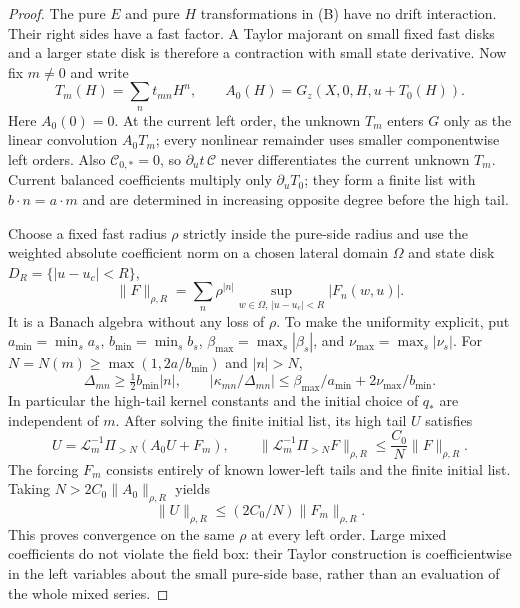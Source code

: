 \begin{proof}
The pure $E$ and pure $H$ transformations in (B) have no drift
interaction.  Their right sides have a fast factor.  A Taylor majorant
on small fixed fast disks and a larger state disk is therefore a
contraction with small state derivative.  Now fix $m\ne0$ and write
\[
 T_m(H)=\sum_n t_{mn}H^n,\qquad
 A_0(H)=G_z(X,0,H,u+T_0(H)).
\]
Here $A_0(0)=0$.  At the current left order, the unknown $T_m$ enters
$G$ only as the linear convolution $A_0T_m$; every nonlinear remainder
uses smaller componentwise left orders.  Also $\mathcal C_{0,*}=0$,
so $\partial_ut\,\mathcal C$ never differentiates the current unknown
$T_m$.  Current balanced coefficients multiply only
$\partial_uT_0$; they form a finite list with $b\cdot n=a\cdot m$ and
are determined in increasing opposite degree before the high tail.

Choose a fixed fast radius $\rho$ strictly inside the pure-side radius
and use the weighted absolute coefficient norm on a chosen lateral
domain $\Omega$ and state disk $D_R=\{|u-u_c|<R\}$,
\begin{equation}\label{eq:additive-tail-norm}
 \|F\|_{\rho,R}=\sum_n\rho^{|n|}
             \sup_{w\in\Omega,\,|u-u_c|<R}|F_n(w,u)|.
\end{equation}
It is a Banach algebra without any loss of $\rho$.  To make the uniformity
explicit, put $a_{\min}=\min_s a_s$, $b_{\min}=\min_s b_s$,
$\beta_{\max}=\max_s|\beta_s|$, and
$\nu_{\max}=\max_s|\nu_s|$.  For
$N=N(m)\ge\max(1,2a/b_{\min})$ and $|n|>N$,
\[
 \Delta_{mn}\ge\tfrac12 b_{\min}|n|,\qquad
 |\kappa_{mn}/\Delta_{mn}|
    \le\beta_{\max}/a_{\min}+2\nu_{\max}/b_{\min}.
\]
In particular the high-tail kernel constants and the initial choice of
$q_*$ are independent of $m$.
After solving the finite initial list, its high tail $U$ satisfies
\begin{equation}\label{eq:additive-tail-contraction}
 U=\mathcal L_m^{-1}\Pi_{>N}(A_0U+F_m),\qquad
 \|\mathcal L_m^{-1}\Pi_{>N}F\|_{\rho,R}
      \le\frac{C_0}{N}\|F\|_{\rho,R}.
\end{equation}
The forcing $F_m$ consists entirely of known lower-left tails and the
finite initial list.  Taking $N>2C_0\|A_0\|_{\rho,R}$ yields
\[
 \|U\|_{\rho,R}\le(2C_0/N)\|F_m\|_{\rho,R}.
\]
This proves convergence on the same $\rho$ at every left order.
Large mixed coefficients do not violate the field box: their Taylor
construction is coefficientwise in the left variables about the small
pure-side base, rather than an evaluation of the whole mixed series.


\end{proof}
